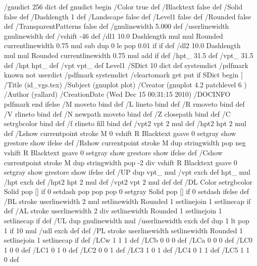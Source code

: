 /gnudict 256 dict def
gnudict begin
%
%
/Color true def
/Blacktext false def
/Solid false def
/Dashlength 1 def
/Landscape false def
/Level1 false def
/Rounded false def
/TransparentPatterns false def
/gnulinewidth 5.000 def
/userlinewidth gnulinewidth def
%
/vshift -46 def
/dl1 {
  10.0 Dashlength mul mul
  Rounded { currentlinewidth 0.75 mul sub dup 0 le { pop 0.01 } if } if
} def
/dl2 {
  10.0 Dashlength mul mul
  Rounded { currentlinewidth 0.75 mul add } if
} def
/hpt_ 31.5 def
/vpt_ 31.5 def
/hpt hpt_ def
/vpt vpt_ def
Level1 {} {
/SDict 10 dict def
systemdict /pdfmark known not {
  userdict /pdfmark systemdict /cleartomark get put
} if
SDict begin [
  /Title (id_vgs.tex)
  /Subject (gnuplot plot)
  /Creator (gnuplot 4.2 patchlevel 6 )
  /Author (yallard)
  /CreationDate (Wed Dec 15 00:31:15 2010)
  /DOCINFO pdfmark
end
} ifelse
%
%
/M {moveto} bind def
/L {lineto} bind def
/R {rmoveto} bind def
/V {rlineto} bind def
/N {newpath moveto} bind def
/Z {closepath} bind def
/C {setrgbcolor} bind def
/f {rlineto fill} bind def
/vpt2 vpt 2 mul def
/hpt2 hpt 2 mul def
/Lshow {currentpoint stroke M 0 vshift R 
	Blacktext {gsave 0 setgray show grestore} {show} ifelse} def
/Rshow {currentpoint stroke M dup stringwidth pop neg vshift R
	Blacktext {gsave 0 setgray show grestore} {show} ifelse} def
/Cshow {currentpoint stroke M dup stringwidth pop -2 div vshift R 
	Blacktext {gsave 0 setgray show grestore} {show} ifelse} def
/UP {dup vpt_ mul /vpt exch def hpt_ mul /hpt exch def
  /hpt2 hpt 2 mul def /vpt2 vpt 2 mul def} def
/DL {Color {setrgbcolor Solid {pop []} if 0 setdash}
 {pop pop pop 0 setgray Solid {pop []} if 0 setdash} ifelse} def
/BL {stroke userlinewidth 2 mul setlinewidth
	Rounded {1 setlinejoin 1 setlinecap} if} def
/AL {stroke userlinewidth 2 div setlinewidth
	Rounded {1 setlinejoin 1 setlinecap} if} def
/UL {dup gnulinewidth mul /userlinewidth exch def
	dup 1 lt {pop 1} if 10 mul /udl exch def} def
/PL {stroke userlinewidth setlinewidth
	Rounded {1 setlinejoin 1 setlinecap} if} def
/LCw {1 1 1} def
/LCb {0 0 0} def
/LCa {0 0 0} def
/LC0 {1 0 0} def
/LC1 {0 1 0} def
/LC2 {0 0 1} def
/LC3 {1 0 1} def
/LC4 {0 1 1} def
/LC5 {1 1 0} def
